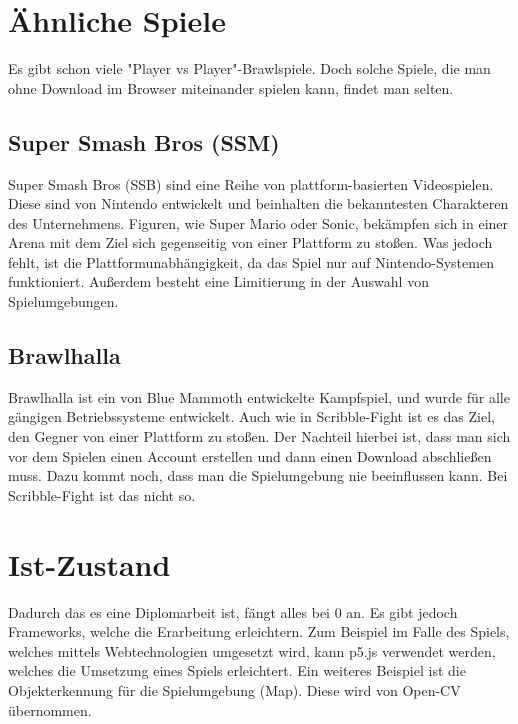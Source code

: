 \section{Ähnliche Spiele}
Es gibt schon viele "Player vs Player"-Brawlspiele. Doch solche Spiele, die man ohne Download im Browser
miteinander spielen kann, findet man selten. 

\subsection{Super Smash Bros (SSM)}
Super Smash Bros (SSB) sind eine Reihe von plattform-basierten Videospielen.
Diese sind von Nintendo entwickelt und beinhalten die bekanntesten Charakteren des Unternehmens.
Figuren, wie Super Mario oder Sonic, bekämpfen sich in einer Arena mit dem Ziel sich gegenseitig 
von einer Plattform zu stoßen.
Was jedoch fehlt, ist die Plattformunabhängigkeit, da das Spiel nur auf Nintendo-Systemen funktioniert.
Außerdem besteht eine Limitierung in der Auswahl von Spielumgebungen.

\subsection{Brawlhalla}
Brawlhalla ist ein von Blue Mammoth entwickelte Kampfspiel, und wurde für alle gängigen Betriebssysteme entwickelt. 
Auch wie in Scribble-Fight ist es das Ziel, den Gegner von einer Plattform zu stoßen.
Der Nachteil hierbei ist, dass man sich vor dem Spielen einen Account erstellen
und dann einen Download abschließen muss. Dazu kommt noch, dass man die Spielumgebung nie beeinflussen kann.
Bei Scribble-Fight ist das nicht so. 


\section{Ist-Zustand}
Dadurch das es eine Diplomarbeit ist, fängt alles bei 0 an. Es gibt jedoch Frameworks,
welche die Erarbeitung erleichtern. Zum Beispiel im Falle des Spiels, welches
mittels Webtechnologien umgesetzt wird, kann p5.js verwendet werden, welches die
Umsetzung eines Spiels erleichtert. Ein weiteres Beispiel ist die Objekterkennung für
die Spielumgebung (Map). Diese wird von Open-CV übernommen.